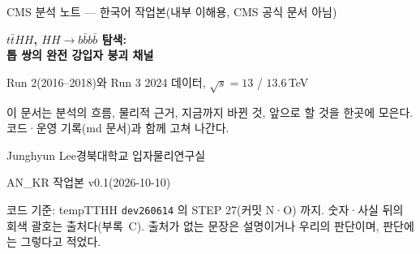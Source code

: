 \documentclass[11pt,a4paper,oneside,openany]{report}
\newcommand{\ANKRversion}{AN\_KR 작업본 v0.1}
\newcommand{\ANKRdate}{2026-10-10}
\begin{document}
\begin{titlepage}
\sffamily
\vspace*{26mm}
\noindent{\color{accent}\rule{\linewidth}{1.2pt}}\par\vspace{5mm}
{\fontsize{13}{17}\selectfont\color{gray}CMS 분석 노트 — 한국어 작업본(내부 이해용, CMS 공식 문서 아님)\par}\vspace{5mm}
{\fontsize{24}{32}\selectfont\bfseries $t\bar{t}HH$, $HH\to b\bar{b}b\bar{b}$ 탐색:\\[1mm] 톱 쌍의 완전 강입자 붕괴 채널\par}\vspace{5mm}
{\Large Run 2(2016–2018)와 Run 3 2024 데이터, $\sqrt{s}=13$ / $13.6\,$TeV\par}\vspace{5mm}
\noindent{\color{accent}\rule{\linewidth}{1.2pt}}\par
\vspace{12mm}
{\large 이 문서는 분석의 흐름, 물리적 근거, 지금까지 바뀐 것, 앞으로 할 것을 한곳에 모은다.
코드·운영 기록(md 문서)과 함께 고쳐 나간다.\par}
\vfill
{\large Junghyun Lee\quad 경북대학교 입자물리연구실\par}\vspace{2mm}
{\large \ANKRversion\quad(\ANKRdate)\par}\vspace{6mm}
{\small\color{gray}코드 기준: tempTTHH \texttt{dev260614} 의 STEP 27(커밋 N·O) 까지.
숫자·사실 뒤의 회색 괄호는 출처다(부록~C). 출처가 없는 문장은 설명이거나 우리의 판단이며, 판단에는 그렇다고 적었다.\par}
\end{titlepage}

\tableofcontents
\clearpage
{}

\setcounter{chapter}{-1}















\appendix



\end{document}
